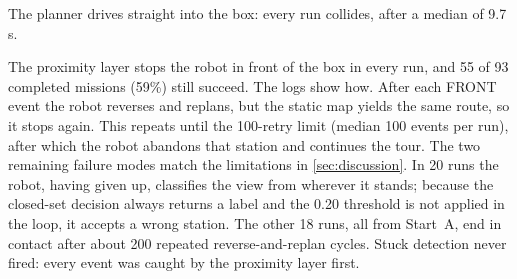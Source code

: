  The planner drives straight into the box: every run collides, after a median of 9.7\,s.

 The proximity layer stops the robot in front of the box in every run, and 55 of 93 completed missions (59\%) still succeed. The logs show how. After each FRONT event the robot reverses and replans, but the static map yields the same route, so it stops again. This repeats until the 100-retry limit (median 100 events per run), after which the robot abandons that station and continues the tour. The two remaining failure modes match the limitations in \cref{sec:discussion}. In 20 runs the robot, having given up, classifies the view from wherever it stands; because the closed-set decision always returns a label and the 0.20 threshold is not applied in the loop, it accepts a wrong station. The other 18 runs, all from Start~A, end in contact after about 200 repeated reverse-and-replan cycles. Stuck detection never fired: every event was caught by the proximity layer first.
